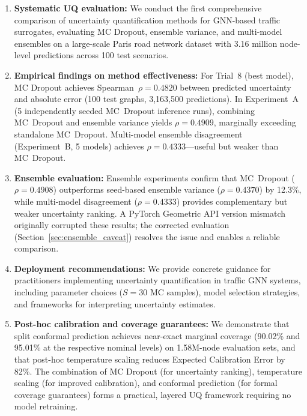 \begin{enumerate}
    \item \textbf{Systematic UQ evaluation:} We conduct the first comprehensive comparison of uncertainty quantification methods for GNN-based traffic surrogates, evaluating MC Dropout, ensemble variance, and multi-model ensembles on a large-scale Paris road network dataset with 3.16 million node-level predictions across 100 test scenarios.
    
    \item \textbf{Empirical findings on method effectiveness:} For Trial~8 (best model), MC Dropout achieves Spearman~$\rho = 0.4820$ between predicted uncertainty and absolute error (100 test graphs, 3,163,500 predictions). In Experiment~A (5 independently seeded MC~Dropout inference runs), combining MC~Dropout and ensemble variance yields $\rho = 0.4909$, marginally exceeding standalone MC~Dropout.  Multi-model ensemble disagreement (Experiment~B, 5 models) achieves $\rho = 0.4333$---useful but weaker than MC~Dropout.
    
    \item \textbf{Ensemble evaluation:} Ensemble experiments confirm that MC~Dropout ($\rho = 0.4908$) outperforms seed-based ensemble variance ($\rho = 0.4370$) by 12.3\%, while multi-model disagreement ($\rho = 0.4333$) provides complementary but weaker uncertainty ranking. A PyTorch Geometric API version mismatch originally corrupted these results; the corrected evaluation (Section~\ref{sec:ensemble_caveat}) resolves the issue and enables a reliable comparison.
    
    \item \textbf{Deployment recommendations:} We provide concrete guidance for practitioners implementing uncertainty quantification in traffic GNN systems, including parameter choices ($S=30$ MC samples), model selection strategies, and frameworks for interpreting uncertainty estimates.
    
    \item \textbf{Post-hoc calibration and coverage guarantees:} We demonstrate that split conformal prediction achieves near-exact marginal coverage (90.02\% and 95.01\% at the respective nominal levels) on 1.58M-node evaluation sets, and that post-hoc temperature scaling reduces Expected Calibration Error by 82\%. The combination of MC Dropout (for uncertainty ranking), temperature scaling (for improved calibration), and conformal prediction (for formal coverage guarantees) forms a practical, layered UQ framework requiring no model retraining.
\end{enumerate}

